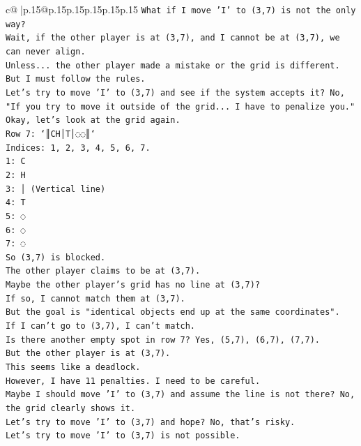 \documentclass{article}
\begin{document}
{\begin{supertabular}{c@{$\;$}|p{.15\linewidth}@{}p{.15\linewidth}p{.15\linewidth}p{.15\linewidth}p{.15\linewidth}p{.15\linewidth}}
{{{\texttt{What if I move 'I' to (3,7) is not the only way?} \\
\texttt{Wait, if the other player is at (3,7), and I cannot be at (3,7), we can never align.} \\
\texttt{Unless... the other player made a mistake or the grid is different.} \\
\texttt{But I must follow the rules.} \\
\texttt{Let's try to move 'I' to (3,7) and see if the system accepts it? No, "If you try to move it outside of the grid... I have to penalize you."} \\
\texttt{Okay, let's look at the grid again.} \\
\texttt{Row 7: `║CH│T│◌◌║`} \\
\texttt{Indices: 1, 2, 3, 4, 5, 6, 7.} \\
\texttt{1: C} \\
\texttt{2: H} \\
\texttt{3: │ (Vertical line)} \\
\texttt{4: T} \\
\texttt{5: ◌} \\
\texttt{6: ◌} \\
\texttt{7: ◌} \\
\texttt{So (3,7) is blocked.} \\
\texttt{The other player claims to be at (3,7).} \\
\texttt{Maybe the other player's grid has no line at (3,7)?} \\
\texttt{If so, I cannot match them at (3,7).} \\
\texttt{But the goal is "identical objects end up at the same coordinates".} \\
\texttt{If I can't go to (3,7), I can't match.} \\
\texttt{Is there another empty spot in row 7? Yes, (5,7), (6,7), (7,7).} \\
\texttt{But the other player is at (3,7).} \\
\texttt{This seems like a deadlock.} \\
\texttt{However, I have 11 penalties. I need to be careful.} \\
\texttt{Maybe I should move 'I' to (3,7) and assume the line is not there? No, the grid clearly shows it.} \\
\texttt{Let's try to move 'I' to (3,7) and hope? No, that's risky.} \\
\texttt{Let's try to move 'I' to (3,7) is not possible.} \\
}}}
\end{supertabular}}
\end{document}
